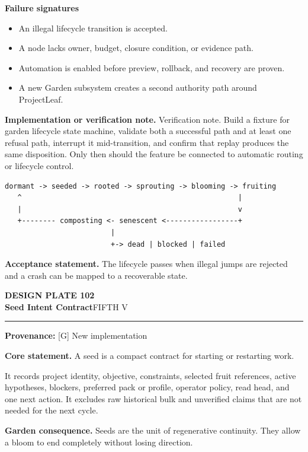 \documentclass[10pt,letterpaper,oneside]{article}
\newcommand{\prov}[1]{\textcolor{gardenBlue}{\sffamily\footnotesize\textbf{Provenance:} #1}}
\newcommand{\platetitle}[3]{%
  \begin{minipage}[t][0.54in][t]{\textwidth}
  {\sffamily\bfseries\color{gardenDeep}\fontsize{9}{10}\selectfont DESIGN PLATE #1}\\[-1pt]
  {\sffamily\bfseries\color{gardenInk}\fontsize{16.5}{18}\selectfont #2}\hfill{\sffamily\color{gardenGreen}\large #3}
  \end{minipage}\vspace{-2pt}\hrule\vspace{5pt}}
\begin{document}
\textbf{Failure signatures}
\begin{itemize}
\item An illegal lifecycle transition is accepted.
\item A node lacks owner, budget, closure condition, or evidence path.
\item Automation is enabled before preview, rollback, and recovery are proven.
\item A new Garden subsystem creates a second authority path around ProjectLeaf.
\end{itemize}
\textbf{Implementation or verification note.} Verification note. Build a fixture for garden lifecycle state machine, validate both a successful path and at least one refusal path, interrupt it mid-transition, and confirm that replay produces the same disposition. Only then should the feature be connected to automatic routing or lifecycle control.

\begin{lstlisting}
dormant -> seeded -> rooted -> sprouting -> blooming -> fruiting
   ^                                                   |
   |                                                   v
   +-------- composting <- senescent <-----------------+
                         |
                         +-> dead | blocked | failed
\end{lstlisting}
\begin{acceptbox}
\textbf{Acceptance statement.} The lifecycle passes when illegal jumps are rejected and a crash can be mapped to a recoverable state.
\end{acceptbox}
\newpage
\platetitle{102}{Seed Intent Contract}{FIFTH V}
\prov{[G] New implementation}
\fontsize{8.85}{10.45}\selectfont
\begin{corebox}
\textbf{Core statement.} A seed is a compact contract for starting or restarting work.
\end{corebox}
It records project identity, objective, constraints, selected fruit references, active hypotheses, blockers, preferred pack or profile, operator policy, read head, and one next action. It excludes raw historical bulk and unverified claims that are not needed for the next cycle.

\textbf{Garden consequence.} Seeds are the unit of regenerative continuity. They allow a bloom to end completely without losing direction.
\end{document}
